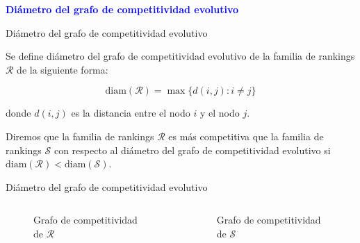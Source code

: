 \documentclass[10pt,hyperref={unicode}]{beamer}
\begin{document}
	\begin{frame}
		\begin{center}
			\Huge\textbf{\textsf{\textcolor{blue}{Diámetro del grafo de competitividad evolutivo}}}
		\end{center}
	\end{frame}
	
	\begin{frame}{Diámetro del grafo de competitividad evolutivo}
		\begin{defi}
			Se define diámetro del grafo de competitividad evolutivo de la familia de rankings $\mathcal{R}$ de la siguiente forma:
			
			\begin{equation}
			\mathrm{diam}(\mathcal{R}) = \max \{ d(i,j) : i \neq j \}
			\end{equation}
			
			donde $d(i,j)$ es la distancia entre el nodo $i$ y el nodo $j$.
		\end{defi}
		
		\begin{defi}
			Diremos que la familia de rankings $\mathcal{R}$ es más competitiva que la familia de rankings $\mathcal{S}$ con respecto al diámetro del grafo de competitividad evolutivo si $\mathrm{diam}(\mathcal{R}) < \mathrm{diam}(\mathcal{S})$.
		\end{defi}
	\end{frame}
	
	\begin{frame}{Diámetro del grafo de competitividad evolutivo}
		\begin{ejemplo}
			\begin{columns}[t] %
				\begin{column}{.50\textwidth}
					\begin{figure}
						\centering
						\resizebox{!}{0.4\textheight}{\ejemplografocompetitividadevolutivo}
						\caption{Grafo de competitividad de $\mathcal{R}$}
					\end{figure}
				\end{column}%
				\hfill%
				\begin{column}{.50\textwidth}
					\begin{figure}
						\centering
						\resizebox{!}{0.4\textheight}{\ejemplofuerzamedia}
						\caption{Grafo de competitividad de $\mathcal{S}$}
					\end{figure}
				\end{column}%
			\end{columns}
		\end{ejemplo}
	\end{frame}
	
\end{document}

